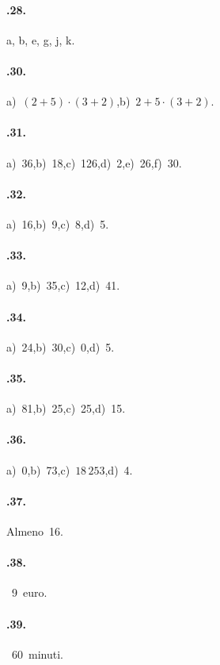 \paragraph{\thechapter.28.}
a, b, e, g, j, k.

\paragraph{\thechapter.30.}
a)~$ (2+5)\cdot(3+2) $,\quad b)~$ 2+5\cdot(3+2) $.

\paragraph{\thechapter.31.}
a)~36,\quad b)~18,\quad c)~126,\quad d)~2,\quad e)~26,\quad f)~30.

\begin{multicols}{2}
\paragraph{\thechapter.32.}
a)~16,\quad b)~9,\quad c)~8,\quad d)~5.

\paragraph{\thechapter.33.}
a)~9,\quad b)~35,\quad c)~12,\quad d)~41.

\paragraph{\thechapter.34.}
a)~24,\quad b)~30,\quad c)~0,\quad d)~5.

\paragraph{\thechapter.35.}
a)~81,\quad b)~25,\quad c)~25,\quad d)~15.

\paragraph{\thechapter.36.}
a)~0,\quad b)~73,\quad c)~$18\,253$,\quad d)~4.

\paragraph{\thechapter.37.}
Almeno~16.

\paragraph{\thechapter.38.}~9~euro.

\paragraph{\thechapter.39.}~60~minuti.
\end{multicols}
